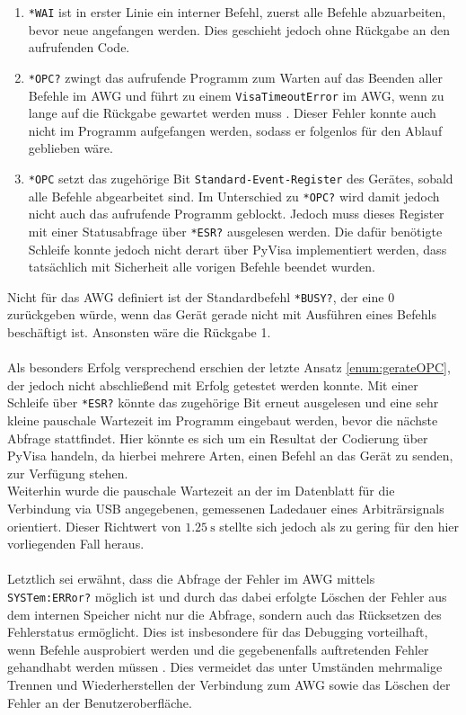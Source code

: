 \documentclass[../Report.tex]{subfiles}
\begin{document}
\begin{enumerate}

	\item \lstinline{*WA}\lstinline{I} ist in erster Linie ein interner Befehl, zuerst alle Befehle abzuarbeiten, bevor neue angefangen werden. Dies geschieht jedoch ohne Rückgabe an den aufrufenden Code.
	
	\item \lstinline{*OPC?} zwingt das aufrufende Programm zum Warten auf das Beenden aller Befehle im AWG und führt zu einem \lstinline{VisaTimeoutError} im AWG, wenn zu lange auf die Rückgabe gewartet werden muss \cite[S. 9]{troeser13}. Dieser Fehler konnte auch nicht im Programm aufgefangen werden, sodass er folgenlos für den Ablauf geblieben wäre.
	
	\item \label{enum:gerateOPC}\lstinline{*OPC} setzt das zugehörige Bit \lstinline{Standard-Event-Register} des Gerätes, sobald alle Befehle abgearbeitet sind. Im Unterschied zu \lstinline{*OPC?} wird damit jedoch nicht auch das aufrufende Programm geblockt. Jedoch muss dieses Register mit einer Statusabfrage über \lstinline{*ESR?} ausgelesen werden. Die dafür benötigte Schleife konnte jedoch nicht derart über PyVisa implementiert werden, dass tatsächlich mit Sicherheit alle vorigen Befehle beendet wurden.

\end{enumerate}

\noindent
Nicht für das AWG definiert ist der Standardbefehl \lstinline{*BU}\lstinline{SY?}, der eine 0 zurückgeben würde, wenn das Gerät gerade nicht mit Ausführen eines Befehls beschäftigt ist. Ansonsten wäre die Rückgabe 1.
\\
\\
Als besonders Erfolg versprechend erschien der letzte Ansatz \ref{enum:gerateOPC}, der jedoch nicht abschließend mit Erfolg getestet werden konnte. Mit einer Schleife über \lstinline{*ES}\lstinline{R?} könnte das zugehörige Bit erneut ausgelesen und eine sehr kleine pauschale Wartezeit im Programm eingebaut werden, bevor die nächste Abfrage stattfindet. Hier könnte es sich um ein Resultat der Codierung über PyVisa handeln, da hierbei mehrere Arten, einen Befehl an das Gerät zu senden, zur Verfügung stehen.
\\
Weiterhin wurde die pauschale Wartezeit an der im Datenblatt \cite[S. 21]{keysData14} für die Verbindung via USB angegebenen, gemessenen Ladedauer eines Arbiträrsignals orientiert. Dieser Richtwert von $\SI{1.25}{\s}$ stellte sich jedoch als zu gering für den hier vorliegenden Fall heraus.
\\
\\
Letztlich sei erwähnt, dass die Abfrage der Fehler im AWG mittels  \lstinline{SYSTem:ERRor?} möglich ist und durch das dabei erfolgte Löschen der Fehler aus dem internen Speicher nicht nur die Abfrage, sondern auch das Rücksetzen des Fehlerstatus ermöglicht. Dies ist insbesondere für das Debugging vorteilhaft, wenn Befehle ausprobiert werden und die gegebenenfalls auftretenden Fehler gehandhabt werden müssen \cite[S. 454]{keysHand15}. Dies vermeidet das unter Umständen mehrmalige Trennen und Wiederherstellen der Verbindung zum AWG sowie das Löschen der Fehler an der Benutzeroberfläche.
\end{document}
